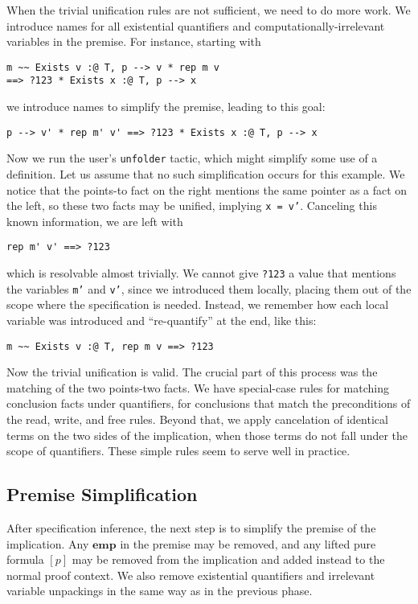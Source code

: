 \documentclass[preprint,nocopyrightspace]{sigplanconf}
\newcommand{\cd}[1]{\texttt{#1}}
\newcommand{\emp}{\mathbf{emp}}
\begin{document}
When the trivial unification rules are not sufficient, we need to do more work.  We introduce names for all existential quantifiers and computationally-irrelevant variables in the premise.  For instance, starting with
\begin{verbatim}
m ~~ Exists v :@ T, p --> v * rep m v
==> ?123 * Exists x :@ T, p --> x
\end{verbatim}
we introduce names to simplify the premise, leading to this goal:
\begin{verbatim}
p --> v' * rep m' v' ==> ?123 * Exists x :@ T, p --> x
\end{verbatim}
Now we run the user's \cd{unfolder} tactic, which might simplify some use of a definition.  Let us assume that no such simplification occurs for this example.  We notice that the points-to fact on the right mentions the same pointer as a fact on the left, so these two facts may be unified, implying \cd{x = v'}.  Canceling this known information, we are left with
\begin{verbatim}
rep m' v' ==> ?123
\end{verbatim}
which is resolvable almost trivially.  We cannot give \cd{?123} a value that mentions the variables \cd{m'} and \cd{v'}, since we introduced them locally, placing them out of the scope where the specification is needed.  Instead, we remember how each local variable was introduced and ``re-quantify'' at the end, like this:
\begin{verbatim}
m ~~ Exists v :@ T, rep m v ==> ?123
\end{verbatim}
Now the trivial unification is valid.  The crucial part of this process was the matching of the two points-two facts.  We have special-case rules for matching conclusion facts under quantifiers, for conclusions that match the preconditions of the read, write, and free rules.  Beyond that, we apply cancelation of identical terms on the two sides of the implication, when those terms do not fall under the scope of quantifiers.  These simple rules seem to serve well in practice.

\subsection{Premise Simplification}

After specification inference, the next step is to simplify the premise of the implication.  Any $\emp$ in the premise may be removed, and any lifted pure formula $[p]$ may be removed from the implication and added instead to the normal proof context.  We also remove existential quantifiers and irrelevant variable unpackings in the same way as in the previous phase.
\end{document}
